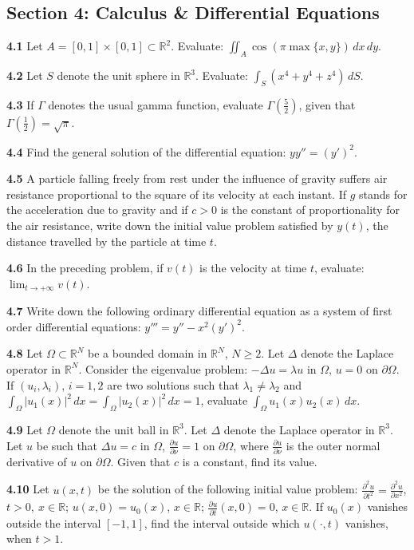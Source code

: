 \documentclass[11pt,a4paper]{article}
\newcommand{\R}{\mathbb{R}}
\newcommand{\examsec}[1]{%
  \subsection*{#1}
  \vspace{-2pt}
}
\newcommand{\qitem}[1]{\par\medskip\noindent\textbf{#1}\hspace{0.5em}}
\begin{document}
\examsec{Section 4: Calculus \& Differential Equations}

\qitem{4.1} Let $A = [0, 1] \times [0, 1] \subset \R^2$. Evaluate: $\displaystyle\iint_A \cos(\pi\max\{x, y\})\,dx\,dy$.

\qitem{4.2} Let $S$ denote the unit sphere in $\R^3$. Evaluate: $\displaystyle\int_S (x^4 + y^4 + z^4)\,dS$.

\qitem{4.3} If $\Gamma$ denotes the usual gamma function, evaluate $\Gamma(\frac{5}{2})$, given that $\Gamma(\frac{1}{2}) = \sqrt{\pi}$.

\qitem{4.4} Find the general solution of the differential equation: $yy'' = (y')^2$.

\qitem{4.5} A particle falling freely from rest under the influence of gravity suffers air resistance proportional to the square of its velocity at each instant. If $g$ stands for the acceleration due to gravity and if $c > 0$ is the constant of proportionality for the air resistance, write down the initial value problem satisfied by $y(t)$, the distance travelled by the particle at time $t$.

\qitem{4.6} In the preceding problem, if $v(t)$ is the velocity at time $t$, evaluate: $\lim_{t \to +\infty} v(t)$.

\qitem{4.7} Write down the following ordinary differential equation as a system of first order differential equations: $y''' = y'' - x^2(y')^2$.

\qitem{4.8} Let $\Omega \subset \R^N$ be a bounded domain in $\R^N$, $N \ge 2$. Let $\Delta$ denote the Laplace operator in $\R^N$. Consider the eigenvalue problem: $-\Delta u = \lambda u$ in $\Omega$, $u = 0$ on $\partial\Omega$. If $(u_i, \lambda_i)$, $i = 1, 2$ are two solutions such that $\lambda_1 \neq \lambda_2$ and $\int_\Omega |u_1(x)|^2\,dx = \int_\Omega |u_2(x)|^2\,dx = 1$, evaluate $\int_\Omega u_1(x)u_2(x)\,dx$.

\qitem{4.9} Let $\Omega$ denote the unit ball in $\R^3$. Let $\Delta$ denote the Laplace operator in $\R^3$. Let $u$ be such that $\Delta u = c$ in $\Omega$, $\frac{\partial u}{\partial \nu} = 1$ on $\partial\Omega$, where $\frac{\partial u}{\partial \nu}$ is the outer normal derivative of $u$ on $\partial\Omega$. Given that $c$ is a constant, find its value.

\qitem{4.10} Let $u(x, t)$ be the solution of the following initial value problem: $\frac{\partial^2 u}{\partial t^2} = \frac{\partial^2 u}{\partial x^2}$, $t > 0,\ x \in \R$; $u(x, 0) = u_0(x)$, $x \in \R$; $\frac{\partial u}{\partial t}(x, 0) = 0$, $x \in \R$. If $u_0(x)$ vanishes outside the interval $[-1, 1]$, find the interval outside which $u(\cdot, t)$ vanishes, when $t > 1$.
\end{document}
